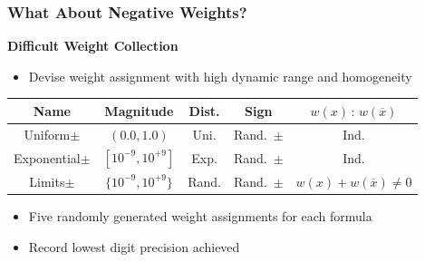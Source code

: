 \documentclass[t,pdf]{beamer}
\newcommand{\obar}[1]{\overline{#1}}
\newcommand{\rtext}[1]{\textcolor{xred}{#1}}
\begin{document}
\begin{frame}
  \frametitle{What About Negative Weights?}

\medskip

  \textbf{Difficult Weight Collection}

\medskip

  \begin{itemize}
    \item Devise weight assignment with high dynamic range and homogeneity
  \end{itemize}

\medskip

\begin{center}
   \begin{tabular}{ccccc}
     Name & Magnitude  & Dist. & Sign & $w(x)\,:\,w(\obar{x})$ \\
     \midrule
     Uniform$\pm$      & $(0.0, 1.0)$     & Uni.  & Rand.~$\pm$   & Ind. \\[0.5em]
     Exponential$\pm$ & $[10^{-9}, 10^{+9}]$ & Exp. & Rand.~$\pm$ & Ind. \\[0.5em]
     \rtext{Limits$\pm$} & \rtext{$\{10^{-9}, 10^{+9}\}$} & \rtext{Rand.} & \rtext{Rand.~$\pm$} & \rtext{$w(x) + w(\obar{x}) \not = 0$} \\
   \end{tabular}
\end{center}

\medskip

  \begin{itemize}
    \item Five randomly generated weight assignments for each formula
    \item Record lowest digit precision achieved
  \end{itemize}

\end{frame}
\end{document}
